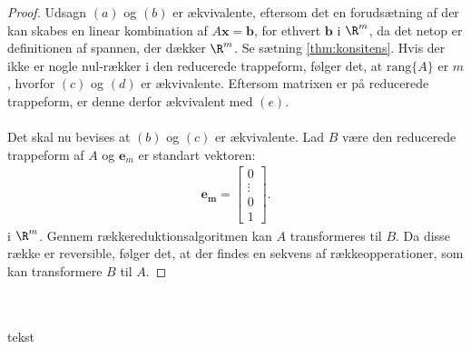 \begin{proof}
%
Udsagn $(a)$ og $(b)$ er ækvivalente, eftersom det en forudsætning af der kan skabes en linear kombination af $A\mathbf{x} =\mathbf{b}$, for ethvert $\mathbf{b}$ i $\R^m$, da det netop er definitionen af spannen, der dækker $\R^m$.
Se sætning \ref{thm:konsitens}.
%
Hvis der ikke er nogle nul-rækker i den reducerede trappeform, følger det, at $\text{rang}\{A\}$ er $m$, hvorfor $(c)$ og $(d)$ er ækvivalente. 
Eftersom matrixen er på reducerede trappeform, er denne derfor ækvivalent med $(e)$.
\\\\
Det skal nu bevises at $(b)$ og $(c)$ er ækvivalente. 
Lad $B$ være den reducerede trappeform af $A$ og $\mathbf{e}_m$ er standart vektoren:
%
\begin{align*}
\mathbf{\mathbf{e}_m} = \begin{bmatrix}
		0 \\
        \vdots \\
        0 \\
        1 
\end{bmatrix}.
\end{align*}
%
i $\R^m$. 
Gennem rækkereduktionsalgoritmen kan $A$ transformeres til $B$. 
Da disse række er reversible, følger det, at der findes en sekvens af rækkeopperationer, som kan transformere $B$ til $A$.

%
\end{proof}
\\\\
%
tekst 
%

